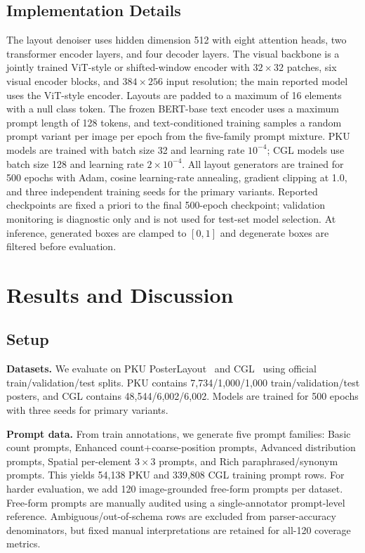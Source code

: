 \documentclass[review]{elsarticle}
\begin{document}
\subsection{Implementation Details}
\label{sec:implementation_details}

The layout denoiser uses hidden dimension 512 with eight attention heads, two transformer encoder layers, and four decoder layers.
The visual backbone is a jointly trained ViT-style or shifted-window encoder with $32{\times}32$ patches, six visual encoder blocks, and $384{\times}256$ input resolution; the main reported model uses the ViT-style encoder.
Layouts are padded to a maximum of 16 elements with a null class token.
The frozen BERT-base text encoder uses a maximum prompt length of 128 tokens, and text-conditioned training samples a random prompt variant per image per epoch from the five-family prompt mixture.
PKU models are trained with batch size 32 and learning rate $10^{-4}$; CGL models use batch size 128 and learning rate $2{\times}10^{-4}$.
All layout generators are trained for 500 epochs with Adam, cosine learning-rate annealing, gradient clipping at 1.0, and three independent training seeds for the primary variants.
Reported checkpoints are fixed a priori to the final 500-epoch checkpoint; validation monitoring is diagnostic only and is not used for test-set model selection.
At inference, generated boxes are clamped to $[0,1]$ and degenerate boxes are filtered before evaluation.

\section{Results and Discussion}
\label{sec:experiments}

\subsection{Setup}
\label{sec:setup}

\textbf{Datasets.}
We evaluate on PKU PosterLayout~\cite{Hsu23a} and CGL~\cite{Zhou22} using official train/validation/test splits.
PKU contains 7,734/1,000/1,000 train/validation/test posters, and CGL contains 48,544/6,002/6,002.
Models are trained for 500 epochs with three seeds for primary variants.

\textbf{Prompt data.}
From train annotations, we generate five prompt families:
Basic count prompts, Enhanced count+coarse-position prompts, Advanced distribution prompts, Spatial per-element $3{\times}3$ prompts, and Rich paraphrased/synonym prompts.
This yields 54,138 PKU and 339,808 CGL training prompt rows.
For harder evaluation, we add 120 image-grounded free-form prompts per dataset.
Free-form prompts are manually audited using a single-annotator prompt-level reference.
Ambiguous/out-of-schema rows are excluded from parser-accuracy denominators, but fixed manual interpretations are retained for all-120 coverage metrics.
\end{document}
